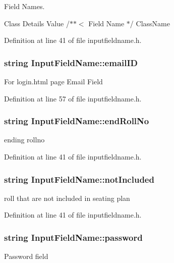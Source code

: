 Field Names. 

Class Details Value /$\ast$$\ast$$<$ Field Name $\ast$/ Class\-Name 

Definition at line 41 of file inputfieldname.\-h.

\hypertarget{classInputFieldName_a05541618feaaebe7a3f74b0bf8fa74b9}{
\subsubsection[{email\-I\-D}]{\setlength{\rightskip}{0pt plus 5cm}string Input\-Field\-Name\-::email\-I\-D}}\label{classInputFieldName_a05541618feaaebe7a3f74b0bf8fa74b9}
For login.\-html page Email Field 

Definition at line 57 of file inputfieldname.\-h.

\hypertarget{classInputFieldName_a06435f9ba5a529cbba4ee1ce9b02e5cc}{
\subsubsection[{end\-Roll\-No}]{\setlength{\rightskip}{0pt plus 5cm}string Input\-Field\-Name\-::end\-Roll\-No}}\label{classInputFieldName_a06435f9ba5a529cbba4ee1ce9b02e5cc}
ending rollno 

Definition at line 41 of file inputfieldname.\-h.

\hypertarget{classInputFieldName_a9ee6ee84737e1199bdfd9fb24c82c2c7}{
\subsubsection[{not\-Included}]{\setlength{\rightskip}{0pt plus 5cm}string Input\-Field\-Name\-::not\-Included}}\label{classInputFieldName_a9ee6ee84737e1199bdfd9fb24c82c2c7}
roll that are not included in seating plan 

Definition at line 41 of file inputfieldname.\-h.

\hypertarget{classInputFieldName_a318f819ef4663d7e5f40d91180093cb9}{
\subsubsection[{password}]{\setlength{\rightskip}{0pt plus 5cm}string Input\-Field\-Name\-::password}}\label{classInputFieldName_a318f819ef4663d7e5f40d91180093cb9}
Password field 

